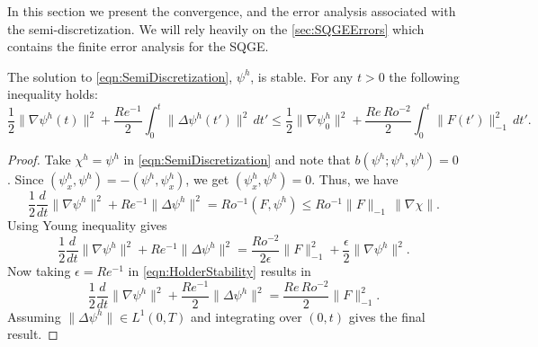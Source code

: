 In this section we present the convergence, and the error analysis associated
with the semi-discretization. We will rely heavily on the
\autoref{sec:SQGEErrors} which contains the finite error analysis for the SQGE.

\begin{prop} \label{prop:Stability}
  The solution to \eqref{eqn:SemiDiscretization}, $\psi^h$, is stable. For
  any $t>0$ the following inequality holds:
  \begin{equation}
    \frac{1}{2}\|\nabla \psi^h(t)\|^2 + \frac{Re^{-1}}{2}\int_{0}^{t}\! \|\Delta
      \psi^h(t')\|^2 \, dt' \le \frac{1}{2} \|\nabla \psi^h_0\|^2
      + \frac{Re\, Ro^{-2}}{2} \int_{0}^{t}\! \|F(t')\|^2_{-1}\, dt'.
    \label{eqn:Stability}
  \end{equation}
\end{prop}
\begin{proof}
  Take $\chi^h = \psi^h$ in \eqref{eqn:SemiDiscretization} and note that
  $b(\psi^h;\psi^h,\psi^h) = 0$. Since $(\psi^h_x,\psi^h) =
  -(\psi^h,\psi^h_x)$, we get $(\psi^h_x, \psi^h) = 0$. Thus, we have
  \begin{equation*}
    \frac{1}{2} \frac{d}{dt} \|\nabla \psi^h\|^2 + Re^{-1} \|\Delta \psi^h\|^2 =
      Ro^{-1} (F,\psi^h) \le Ro^{-1} \|F\|_{-1}\,\|\nabla \chi\|.
  \end{equation*}
  Using Young inequality gives
  \begin{equation}
    \frac{1}{2} \frac{d}{dt} \|\nabla \psi^h\|^2 + Re^{-1} \|\Delta \psi^h\|^2 =
      \frac{Ro^{-2}}{2\epsilon} \|F\|_{-1}^2 + \frac{\epsilon}{2}\|\nabla
      \psi^h\|^2.
      \label{eqn:HolderStability}
  \end{equation}
  Now taking $\epsilon = Re^{-1}$ in \eqref{eqn:HolderStability} results in
  \begin{equation*}
    \frac{1}{2} \frac{d}{dt} \|\nabla \psi^h\|^2 + \frac{Re^{-1}}{2} \|\Delta
      \psi^h\|^2 = \frac{Re\,Ro^{-2}}{2} \|F\|_{-1}^2.
  \end{equation*}
  Assuming $\|\Delta \psi^h\| \in L^1(0,T)$ and integrating over $(0,t)$ gives
  the final result.
\end{proof}


